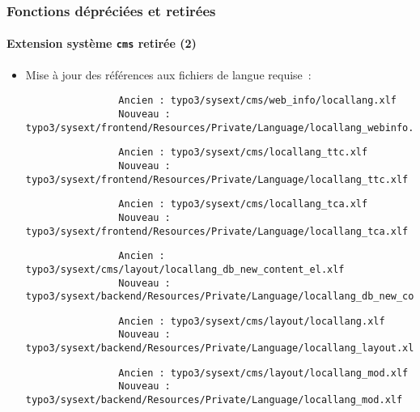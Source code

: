 \begin{frame}[fragile]
	\frametitle{Fonctions dépréciées et retirées}
	\framesubtitle{Extension système \texttt{cms} retirée (2)}

	\lstset{basicstyle=\tiny\ttfamily}

	\begin{itemize}

		\item Mise à jour des références aux fichiers de langue requise~:


			\begin{lstlisting}
				Ancien : typo3/sysext/cms/web_info/locallang.xlf
				Nouveau : typo3/sysext/frontend/Resources/Private/Language/locallang_webinfo.xlf
			\end{lstlisting}
			\vspace{-0.3cm}
			\begin{lstlisting}
				Ancien : typo3/sysext/cms/locallang_ttc.xlf
				Nouveau : typo3/sysext/frontend/Resources/Private/Language/locallang_ttc.xlf
			\end{lstlisting}
			\vspace{-0.3cm}
			\begin{lstlisting}
				Ancien : typo3/sysext/cms/locallang_tca.xlf
				Nouveau : typo3/sysext/frontend/Resources/Private/Language/locallang_tca.xlf
			\end{lstlisting}
			\vspace{-0.3cm}
			\begin{lstlisting}
				Ancien : typo3/sysext/cms/layout/locallang_db_new_content_el.xlf
				Nouveau : typo3/sysext/backend/Resources/Private/Language/locallang_db_new_content_el.xlf
			\end{lstlisting}
			\vspace{-0.3cm}
			\begin{lstlisting}
				Ancien : typo3/sysext/cms/layout/locallang.xlf
				Nouveau : typo3/sysext/backend/Resources/Private/Language/locallang_layout.xlf
			\end{lstlisting}
			\vspace{-0.3cm}
			\begin{lstlisting}
				Ancien : typo3/sysext/cms/layout/locallang_mod.xlf
				Nouveau : typo3/sysext/backend/Resources/Private/Language/locallang_mod.xlf

\end{lstlisting}
\end{itemize}
\end{frame}
